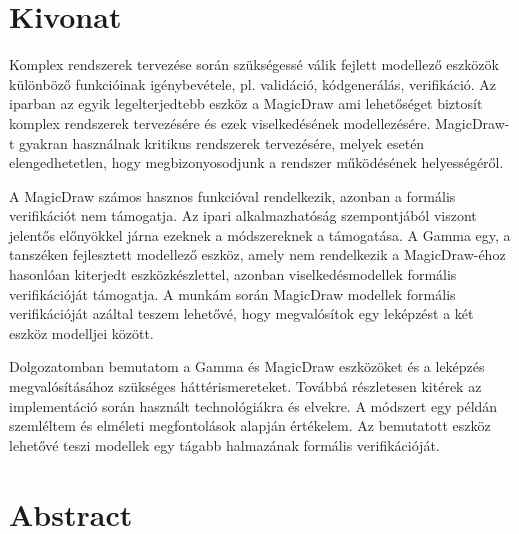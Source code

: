 \setcounter{page}{1}

\selecthungarian

\chapter*{Kivonat}

Komplex rendszerek tervezése során szükségessé válik fejlett modellező eszközök különböző funkcióinak igénybevétele, pl. validáció, kódgenerálás, verifikáció. Az iparban az egyik legelterjedtebb eszköz a MagicDraw ami lehetőséget biztosít komplex rendszerek tervezésére és ezek viselkedésének modellezésére. MagicDraw-t gyakran használnak kritikus rendszerek tervezésére, melyek esetén elengedhetetlen, hogy megbizonyosodjunk a rendszer működésének helyességéről.

A MagicDraw számos hasznos funkcióval rendelkezik, azonban a formális verifikációt nem támogatja. Az ipari alkalmazhatóság szempontjából viszont jelentős előnyökkel járna ezeknek a módszereknek a támogatása.
A Gamma egy, a tanszéken fejlesztett modellező eszköz, amely nem rendelkezik a MagicDraw-éhoz hasonlóan kiterjedt eszközkészlettel, azonban viselkedésmodellek formális verifikációját támogatja. A munkám során MagicDraw modellek formális verifikációját azáltal teszem lehetővé, hogy megvalósítok egy leképzést a két eszköz modelljei között.

Dolgozatomban bemutatom a Gamma és MagicDraw eszközöket és a leképzés megvalósításához szükséges háttérismereteket. Továbbá részletesen kitérek az implementáció során használt technológiákra és elvekre. A módszert egy példán szemléltem és elméleti megfontolások alapján értékelem. Az bemutatott eszköz lehetővé teszi modellek egy tágabb halmazának formális verifikációját.


\vfill
\selectenglish


\chapter*{Abstract}

